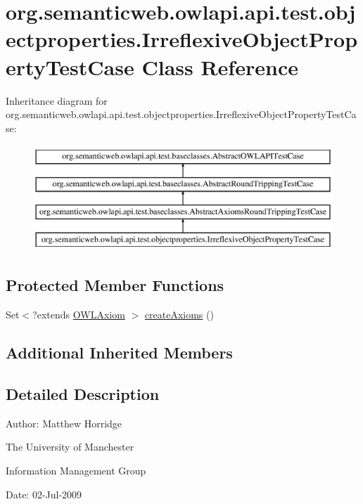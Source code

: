 \hypertarget{classorg_1_1semanticweb_1_1owlapi_1_1api_1_1test_1_1objectproperties_1_1_irreflexive_object_property_test_case}{\section{org.\-semanticweb.\-owlapi.\-api.\-test.\-objectproperties.\-Irreflexive\-Object\-Property\-Test\-Case Class Reference}
\label{classorg_1_1semanticweb_1_1owlapi_1_1api_1_1test_1_1objectproperties_1_1_irreflexive_object_property_test_case}
}
Inheritance diagram for org.\-semanticweb.\-owlapi.\-api.\-test.\-objectproperties.\-Irreflexive\-Object\-Property\-Test\-Case\-:\begin{figure}[H]
\begin{center}
\leavevmode
\includegraphics[height=4.000000cm]{classorg_1_1semanticweb_1_1owlapi_1_1api_1_1test_1_1objectproperties_1_1_irreflexive_object_property_test_case}
\end{center}
\end{figure}
\subsection*{Protected Member Functions}
\begin{DoxyCompactItemize}
\item 
Set$<$?extends \hyperlink{interfaceorg_1_1semanticweb_1_1owlapi_1_1model_1_1_o_w_l_axiom}{O\-W\-L\-Axiom} $>$ \hyperlink{classorg_1_1semanticweb_1_1owlapi_1_1api_1_1test_1_1objectproperties_1_1_irreflexive_object_property_test_case_ae3ea5adc392530b61de76b1fb13a3c30}{create\-Axioms} ()
\end{DoxyCompactItemize}
\subsection*{Additional Inherited Members}


\subsection{Detailed Description}
Author\-: Matthew Horridge\par
 The University of Manchester\par
 Information Management Group\par
 Date\-: 02-\/\-Jul-\/2009 

